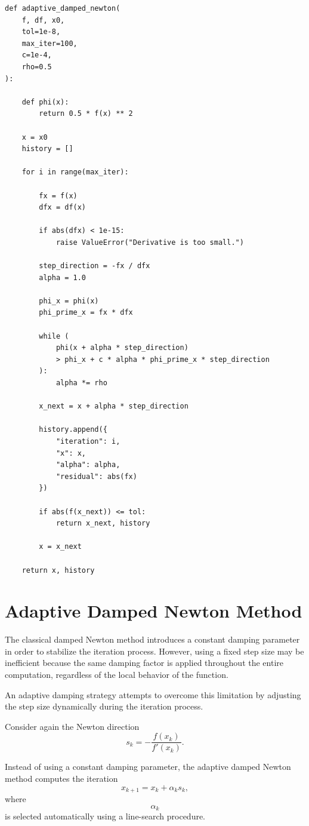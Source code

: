 \begin{lstlisting}
def adaptive_damped_newton(
    f, df, x0,
    tol=1e-8,
    max_iter=100,
    c=1e-4,
    rho=0.5
):

    def phi(x):
        return 0.5 * f(x) ** 2

    x = x0
    history = []

    for i in range(max_iter):

        fx = f(x)
        dfx = df(x)

        if abs(dfx) < 1e-15:
            raise ValueError("Derivative is too small.")

        step_direction = -fx / dfx
        alpha = 1.0

        phi_x = phi(x)
        phi_prime_x = fx * dfx

        while (
            phi(x + alpha * step_direction)
            > phi_x + c * alpha * phi_prime_x * step_direction
        ):
            alpha *= rho

        x_next = x + alpha * step_direction

        history.append({
            "iteration": i,
            "x": x,
            "alpha": alpha,
            "residual": abs(fx)
        })

        if abs(f(x_next)) <= tol:
            return x_next, history

        x = x_next

    return x, history
\end{lstlisting}

\section{Adaptive Damped Newton Method}

The classical damped Newton method introduces a constant damping parameter in order to stabilize the iteration process. However, using a fixed step size may be inefficient because the same damping factor is applied throughout the entire computation, regardless of the local behavior of the function.

An adaptive damping strategy attempts to overcome this limitation by adjusting the step size dynamically during the iteration process.

Consider again the Newton direction
\[
s_k
=
-
\frac{f(x_k)}{f'(x_k)}.
\]

Instead of using a constant damping parameter, the adaptive damped Newton method computes the iteration
\[
x_{k+1}
=
x_k+\alpha_k s_k,
\]
where
\[
\alpha_k
\]
is selected automatically using a line-search procedure.

